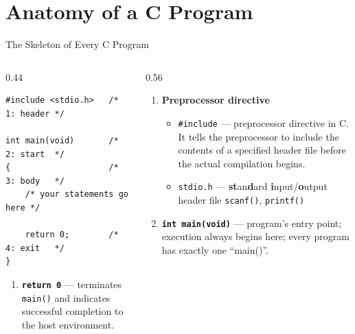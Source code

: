 \documentclass[aspectratio=169]{beamer}
\begin{document}
	\section{Anatomy of a C Program}

	\begin{frame}[fragile]{The Skeleton of Every C Program}
		\vspace*{-0.25cm}
		\begin{columns}[T]
			
			\begin{column}{0.44\textwidth}
				
\begin{lstlisting}
#include <stdio.h>   /* 1: header */

int main(void)       /* 2: start  */
{                    /* 3: body   */
	/* your statements go here */
	
	return 0;        /* 4: exit   */
}
\end{lstlisting}
			
			\begin{enumerate}\small
				\setcounter{enumi}{3}
				\item \textbf{\texttt{return 0}} ---
				terminates \texttt{main()} and indicates successful
				completion to the host environment.
			\end{enumerate}
			
			\end{column}
			
			\begin{column}{0.56\textwidth}
				
				\begin{enumerate}\small
					
					\item \textbf{Preprocessor directive}
					\begin{itemize}\footnotesize
						\item \texttt{\#include} --- preprocessor directive in C. It tells the preprocessor to include the contents of a specified header file before the actual compilation begins.
						\item \texttt{stdio.h} --- \textbf{st}an\textbf{d}ard \textbf{i}nput/\textbf{o}utput header file \texttt{scanf()}, \texttt{printf()}
					\end{itemize}
					
					\item \textbf{\texttt{int main(void)}} ---
					program's entry point; execution always begins here; every program has exactly one ``main()''.
					

\end{enumerate}
\end{column}
\end{columns}
\end{frame}
\end{document}
